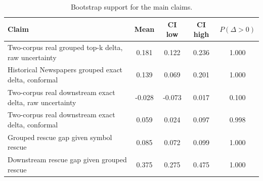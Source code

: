 \begin{table}[t]
\caption{Bootstrap support for the main claims.}
\label{tab:appendix_robustness}
\centering
\footnotesize
\setlength{\tabcolsep}{4pt}
\renewcommand{\arraystretch}{1.06}
\begin{tabular}{@{}p{5.2cm}cccc@{}}
\toprule
\textbf{Claim} & \textbf{Mean} & \textbf{CI low} & \textbf{CI high} & \textbf{$P(\Delta > 0)$} \\
\midrule
Two-corpus real grouped top-k delta, raw uncertainty & 0.181 & 0.122 & 0.236 & 1.000 \\
Historical Newspapers grouped exact delta, conformal & 0.139 & 0.069 & 0.201 & 1.000 \\
Two-corpus real downstream exact delta, raw uncertainty & -0.028 & -0.073 & 0.017 & 0.100 \\
Two-corpus real downstream exact delta, conformal & 0.059 & 0.024 & 0.097 & 0.998 \\
Grouped rescue gap given symbol rescue & 0.085 & 0.072 & 0.099 & 1.000 \\
Downstream rescue gap given grouped rescue & 0.375 & 0.275 & 0.475 & 1.000 \\
\bottomrule
\end{tabular}
\end{table}
